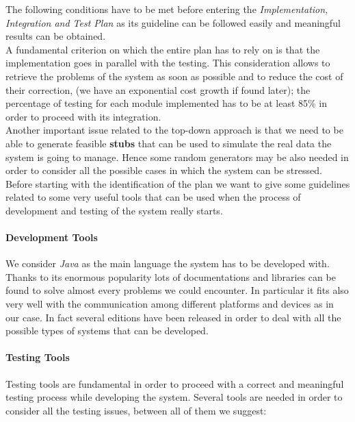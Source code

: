 		The following conditions have to be met before entering the \emph{Implementation, Integration and Test Plan} as its guideline can be followed easily and meaningful results can be obtained.\\
		
		A fundamental criterion on which the entire plan has to rely on is that the implementation goes in parallel with the testing. This consideration allows to retrieve the problems of the system as soon as possible and to reduce the cost of their correction, (we have an exponential cost growth if found later); the percentage of testing for each module implemented has to be at least 85\% in order to proceed with its integration.\\
		
		Another important issue related to the top-down approach is that we need to be able to generate feasible \textbf{stubs} that can be used to simulate the real data the system is going to manage. Hence some random generators may be also needed in order to consider all the possible cases in which the system can be stressed.\\
		
		Before starting with the identification of the plan we want to give some guidelines related to some very useful tools that can be used when the process of development and testing of the system really starts.
		
		\paragraph{Development Tools} We consider \emph{Java} as the main language the system has to be developed with. Thanks to its enormous popularity lots of documentations and libraries can be found to solve almost every problems we could encounter. In particular it fits also very well with the communication among different platforms and devices as in our case. In fact several editions have been released in order to deal with all the possible types of systems that can be developed.
		
		\paragraph{Testing Tools} Testing tools are fundamental in order to proceed with a correct and meaningful testing process while developing the system. Several tools are needed in order to consider all the testing issues, between all of them we suggest:
		
